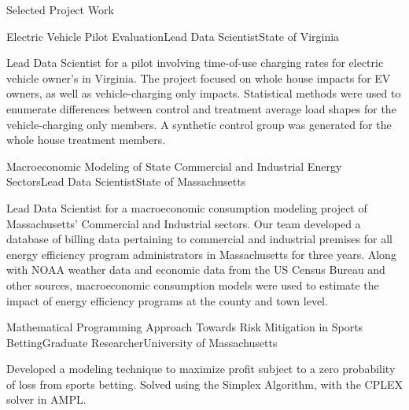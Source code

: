 \documentclass{resume} %
\begin{document}
\begin{rSection}{Selected Project Work}
\begin{rSubsection}{Electric Vehicle Pilot Evaluation}{}{Lead Data Scientist}{State of Virginia}
\item[] Lead Data Scientist for a pilot involving time-of-use charging rates for electric vehicle owner's in Virginia. The project focused on whole house impacts for EV owners, as well as vehicle-charging only impacts. Statistical methods were used to enumerate differences between control and treatment average load shapes for the vehicle-charging only members. A synthetic control group was generated for the whole house treatment members.
\end{rSubsection}  

\begin{rSubsection}{Macroeconomic Modeling of State Commercial and Industrial Energy Sectors}{}{Lead Data Scientist}{State of Massachusetts}
\item[] Lead Data Scientist for a macroeconomic consumption modeling project of Massachusetts' Commercial and Industrial sectors. Our team developed a database of billing data pertaining to commercial and industrial premises for all energy efficiency program administrators in Massachusetts for three years. Along with NOAA weather data and economic data from the US Census Bureau and other sources, macroeconomic consumption models were used to estimate the impact of energy efficiency programs at the county and town level. 
\end{rSubsection}  

\begin{rSubsection}{Mathematical Programming Approach Towards Risk Mitigation in Sports Betting}{}{Graduate Researcher}{University of Massachusetts}
\item[] Developed a modeling technique to maximize profit subject to a zero probability of loss from sports betting. Solved using the Simplex Algorithm, with the CPLEX solver in AMPL.
\end{rSubsection} 

\end{rSection}

\pagebreak

\end{document}
